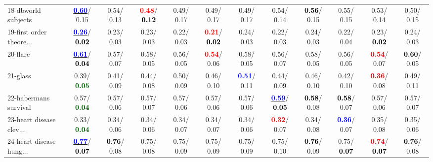 \begin{table}[h]
\begin{center}
{\begin{tabular}{lc|c|c|c|c|c|c|c|c|c|c}
18-dbworld subjects & \underline{\textcolor{blue}{\textbf{  0.60}}}/  0.15 &   0.54/  0.13 & \textcolor{red}{\textbf{  0.48}}/\textcolor{black}{\textbf{  0.12}} &   0.49/  0.17 &   0.49/  0.17 &   0.49/  0.17 &   0.54/  0.14 & \textcolor{black}{\textbf{  0.56}}/  0.15 &   0.55/  0.15 &   0.53/  0.14 &   0.50/  0.15 \\
19-first order theore... & \underline{\textcolor{blue}{\textbf{  0.26}}}/\textcolor{black}{\textbf{  0.02}} &   0.23/  0.03 &   0.23/  0.03 &   0.22/  0.03 & \textcolor{red}{\textbf{  0.21}}/\textcolor{black}{\textbf{  0.02}} &   0.24/  0.03 &   0.22/  0.03 &   0.24/  0.03 &   0.22/  0.04 &   0.23/\textcolor{black}{\textbf{  0.02}} &   0.24/  0.03 \\
20-flare & \underline{\textcolor{blue}{\textbf{  0.61}}}/\textcolor{black}{\textbf{  0.04}} &   0.57/  0.07 &   0.58/  0.05 &   0.56/  0.05 & \textcolor{red}{\textbf{  0.54}}/  0.06 &   0.58/  0.05 &   0.56/  0.07 &   0.58/  0.05 &   0.56/  0.05 & \textcolor{red}{\textbf{  0.54}}/  0.07 & \textcolor{black}{\textbf{  0.60}}/  0.05 \\
21-glass &   0.39/\textcolor{darkgreen}{\textbf{  0.05}} &   0.41/  0.09 &   0.44/  0.08 &   0.50/  0.09 &   0.46/  0.10 & \textcolor{blue}{\textbf{  0.51}}/  0.11 &   0.44/  0.09 &   0.46/  0.10 &   0.42/  0.10 & \textcolor{red}{\textbf{  0.36}}/  0.08 &   0.49/  0.11 \\ \hline
22-habermans survival &   0.57/\textcolor{darkgreen}{\textbf{  0.04}} &   0.57/  0.06 &   0.57/  0.07 &   0.57/  0.06 &   0.57/  0.06 &   0.57/  0.06 & \underline{\textcolor{blue}{\textbf{  0.59}}}/\textcolor{black}{\textbf{  0.05}} & \textcolor{black}{\textbf{  0.58}}/  0.08 & \textcolor{black}{\textbf{  0.58}}/  0.07 &   0.57/  0.06 &   0.57/  0.07 \\
23-heart disease clev... &   0.33/\textcolor{darkgreen}{\textbf{  0.04}} &   0.34/  0.06 &   0.34/  0.06 &   0.34/  0.07 &   0.34/  0.07 &   0.34/  0.06 & \textcolor{red}{\textbf{  0.32}}/  0.07 &   0.34/  0.08 & \textcolor{blue}{\textbf{  0.36}}/  0.07 &   0.35/  0.08 &   0.35/  0.06 \\
24-heart disease hung... & \underline{\textcolor{blue}{\textbf{  0.77}}}/\textcolor{black}{\textbf{  0.07}} & \textcolor{black}{\textbf{  0.76}}/  0.08 &   0.75/  0.08 &   0.75/  0.09 &   0.75/  0.09 &   0.75/  0.09 &   0.75/  0.10 & \textcolor{black}{\textbf{  0.76}}/  0.09 &   0.75/\textcolor{black}{\textbf{  0.07}} & \textcolor{red}{\textbf{  0.74}}/\textcolor{black}{\textbf{  0.07}} & \textcolor{black}{\textbf{  0.76}}/  0.08 \\

\end{tabular}}
\end{center}
\end{table}
